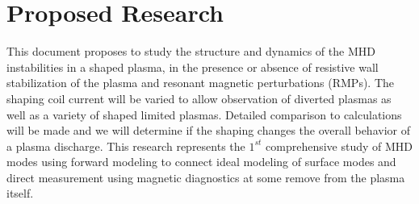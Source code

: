 \documentclass[aps,preprint,showpacs,superscriptaddress,groupedaddress]{revtex4}  %
\begin{document}

\section{Proposed Research}
	This document proposes to study the structure and dynamics of the MHD instabilities in a shaped plasma, in the presence or absence of resistive wall  stabilization of the plasma and resonant magnetic perturbations (RMPs).  The shaping coil current will be varied to allow observation of diverted plasmas as well as a variety of shaped limited plasmas.  Detailed comparison to calculations will be made and we will determine if the shaping changes the overall behavior of a plasma discharge.  This research represents the $1^{st}$ comprehensive study of MHD modes using forward modeling to connect ideal modeling of surface modes and direct measurement using magnetic diagnostics at some remove from the plasma itself.\par
\end{document}
